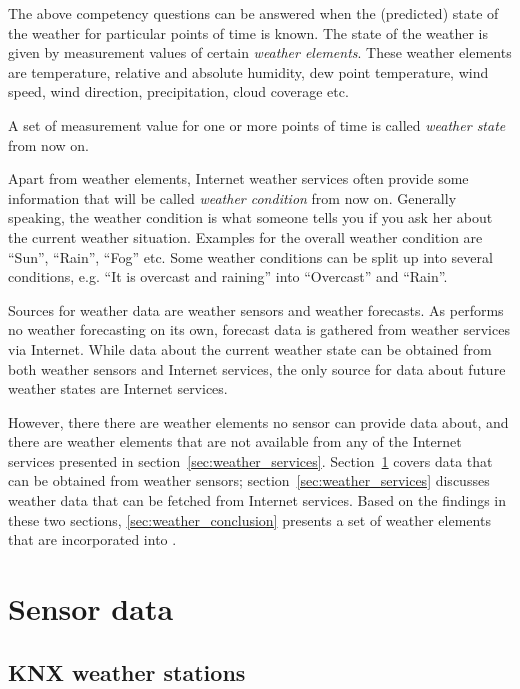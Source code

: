 The above competency questions can be answered when the (predicted) state of the weather for particular points of time is known. The state of the weather is given by measurement values of certain \emph{weather elements}. These weather elements are temperature, relative and absolute humidity, dew point temperature, wind speed, wind direction, precipitation, cloud coverage etc.\cite{GlossaryOfMeteorology}

A set of measurement value for one or more points of time is called \emph{weather state} from now on.

Apart from weather elements, Internet weather services often provide some information that will be called \emph{weather condition} from now on. Generally speaking, the weather condition is what someone tells you if you ask her about the current weather situation. Examples for the overall weather condition are ``Sun'', ``Rain'', ``Fog'' etc. Some weather conditions can be split up into several conditions, e.g. ``It is overcast and raining'' into ``Overcast'' and ``Rain''.

Sources for weather data are weather sensors and weather forecasts. As \thinkhome performs no weather forecasting on its own, forecast data is gathered from weather services via Internet. While data about the current weather state can be obtained from both weather sensors and Internet services, the only source for data about future weather states are Internet services.

However, there there are weather elements no sensor can provide data about, and there are weather elements that are not available from any of the Internet services presented in section~\ref{sec:weather_services}. Section~\ref{sec:weather_sensors} covers data that can be obtained from weather sensors; section~\ref{sec:weather_services} discusses weather data that can be fetched from Internet services. Based on the findings in these two sections, \ref{sec:weather_conclusion} presents a set of weather elements that are incorporated into \thinkhomeweather.

\section{Sensor data}
\label{sec:weather_sensors}


\subsection{KNX weather stations}

